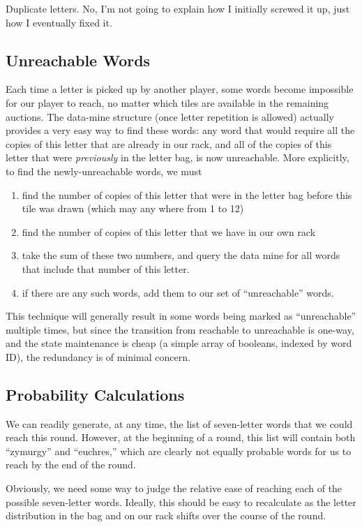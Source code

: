\documentclass[11pt]{article}
\begin{document}
Duplicate letters.  No, I'm not going to explain how I initially screwed it up, just how I eventually fixed it.

\subsection{Unreachable Words}

Each time a letter is picked up by another player, some words become impossible for our player to reach, no matter which tiles are available in the remaining auctions.  The data-mine structure (once letter repetition is allowed) actually provides a very easy way to find these words: any word that would require all the copies of this letter that are already in our rack, and all of the copies of this letter that were \textit{previously} in the letter bag, is now unreachable.  More explicitly, to find the newly-unreachable words, we must
\begin{enumerate}
\item find the number of copies of this letter that were in the letter bag before this tile was drawn (which may any where from 1 to 12)
\item find the number of copies of this letter that we have in our own rack
\item take the sum of these two numbers, and query the data mine for all words that include that number of this letter.
\item if there are any such words, add them to our set of ``unreachable'' words.
\end{enumerate}

This technique will generally result in some words being marked as ``unreachable'' multiple times, but since the transition from reachable to unreachable is one-way, and the state maintenance is cheap (a simple array of booleans, indexed by word ID), the redundancy is of minimal concern.

\subsection{Probability Calculations} %

We can readily generate, at any time, the list of seven-letter words that we could reach this round.  However, at the beginning of a round, this list will contain both ``zymurgy'' and ``euchres,'' which are clearly not equally probable words for us to reach by the end of the round.

Obviously, we need some way to judge the relative ease of reaching each of the possible seven-letter words.  Ideally, this should be easy to recalculate as the letter distribution in the bag and on our rack shifts over the course of the round.
\end{document}
